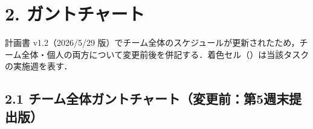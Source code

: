 \documentclass[a4paper,11pt]{ltjsarticle}
\providecommand{\％}{\%}
\begin{document}
\section{2. ガントチャート}

計画書 v1.2（2026/5/29 版）でチーム全体のスケジュールが更新されたため，チーム全体・個人の両方について変更前後を併記する．着色セル（\colorbox{ganttCell}{\phantom{xx}}）は当該タスクの実施週を表す．

\renewcommand{\arraystretch}{1.3}

\begingroup
\setlength{\tabcolsep}{3pt}

\subsection*{2.1 チーム全体ガントチャート（変更前：第5週末提出版）}
\end{document}
